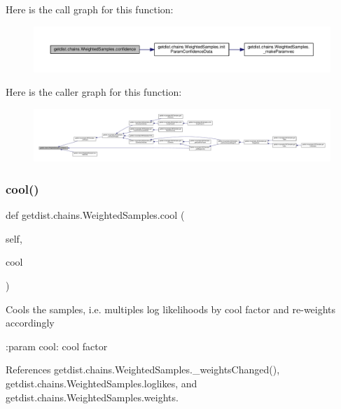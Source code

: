 Here is the call graph for this function\+:
\nopagebreak
\begin{figure}[H]
\begin{center}
\leavevmode
\includegraphics[width=350pt]{classgetdist_1_1chains_1_1WeightedSamples_aafea7daa99724b91392e41c4157a29a0_cgraph}
\end{center}
\end{figure}
Here is the caller graph for this function\+:
\nopagebreak
\begin{figure}[H]
\begin{center}
\leavevmode
\includegraphics[width=350pt]{classgetdist_1_1chains_1_1WeightedSamples_aafea7daa99724b91392e41c4157a29a0_icgraph}
\end{center}
\end{figure}
\mbox{\label{classgetdist_1_1chains_1_1WeightedSamples_ac1117664a18dbf44a352512c36c6a675}} 
\subsubsection{\texorpdfstring{cool()}{cool()}}
{\footnotesize\ttfamily def getdist.\+chains.\+Weighted\+Samples.\+cool (\begin{DoxyParamCaption}\item[{}]{self,  }\item[{}]{cool }\end{DoxyParamCaption})}

\begin{DoxyVerb}Cools the samples, i.e. multiples log likelihoods by cool factor and re-weights accordingly

:param cool: cool factor
\end{DoxyVerb}
 

References getdist.\+chains.\+Weighted\+Samples.\+\_\+weights\+Changed(), getdist.\+chains.\+Weighted\+Samples.\+loglikes, and getdist.\+chains.\+Weighted\+Samples.\+weights.

